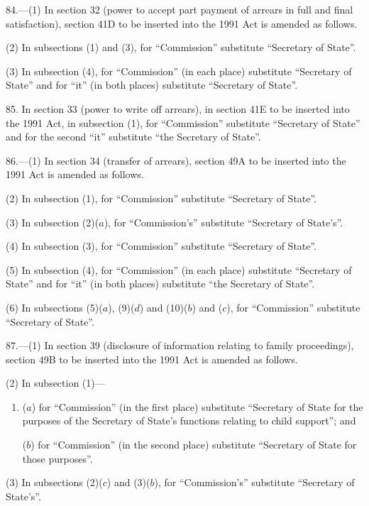 \documentclass[12pt,a4paper]{article}
\begin{document}
\medskip

84.---(1)  In section 32 (power to accept part payment of arrears in full and final satisfaction), section 41D to be inserted into the 1991 Act is amended as follows.

(2) In subsections (1) and (3), for “Commission” substitute “Secretary of State”.

(3) In subsection (4), for “Commission” (in each place) substitute “Secretary of State” and for “it” (in both places) substitute “Secretary of State”.

\medskip

85.  In section 33 (power to write off arrears), in section 41E to be inserted into the 1991 Act, in subsection (1), for “Commission” substitute “Secretary of State” and for the second “it” substitute “the Secretary of State”.

\medskip

86.---(1)  In section 34 (transfer of arrears), section 49A to be inserted into the 1991 Act is amended as follows.

(2) In subsection (1), for “Commission” substitute “Secretary of State”.

(3) In subsection (2)($a$), for “Commission’s” substitute “Secretary of State’s”.

(4) In subsection (3), for “Commission” substitute “Secretary of State”.

(5) In subsection (4), for “Commission” (in each place) substitute “Secretary of State” and for “it” (in both places) substitute “the Secretary of State”.

(6) In subsections (5)($a$), (9)($d$)  and (10)($b$)  and ($c$), for “Commission” substitute “Secretary of State”.

\medskip

87.---(1)  In section 39 (disclosure of information relating to family proceedings), section 49B to be inserted into the 1991 Act is amended as follows.

(2) In subsection (1)—
\begin{enumerate}\item[]
($a$) for “Commission” (in the first place) substitute “Secretary of State for the purposes of the Secretary of State’s functions relating to child support”; and

($b$) for “Commission” (in the second place) substitute “Secretary of State for those purposes”.
\end{enumerate}

(3) In subsections (2)($c$)  and (3)($b$), for “Commission’s” substitute “Secretary of State’s”.
\end{document}

